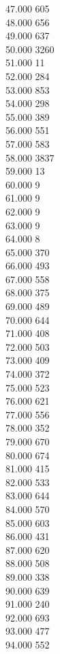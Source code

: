 { 47.000	605 \\
 48.000	656 \\
 49.000	637 \\
 50.000	3260 \\
 51.000	11 \\
 52.000	284 \\
 53.000	853 \\
 54.000	298 \\
 55.000	389 \\
 56.000	551 \\
 57.000	583 \\
 58.000	3837 \\
 59.000	13 \\
 60.000	9 \\
 61.000	9 \\
 62.000	9 \\
 63.000	9 \\
 64.000	8 \\
 65.000	370 \\
 66.000	493 \\
 67.000	558 \\
 68.000	375 \\
 69.000	489 \\
 70.000	644 \\
 71.000	408 \\
 72.000	503 \\
 73.000	409 \\
 74.000	372 \\
 75.000	523 \\
 76.000	621 \\
 77.000	556 \\
 78.000	352 \\
 79.000	670 \\
 80.000	674 \\
 81.000	415 \\
 82.000	533 \\
 83.000	644 \\
 84.000	570 \\
 85.000	603 \\
 86.000	431 \\
 87.000	620 \\
 88.000	508 \\
 89.000	338 \\
 90.000	639 \\
 91.000	240 \\
 92.000	693 \\
 93.000	477 \\
 94.000	552 \\
}
